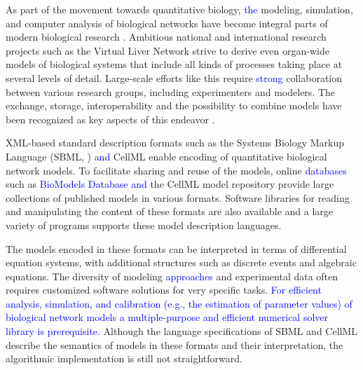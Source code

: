 \documentclass[10pt]{bmc_article}
\newenvironment{bmcformat}{\fussy\setboolean{publ}{true}}{\fussy}
\newcommand{\COR}[1]{\textcolor{blue}{#1}}
\begin{document}
\begin{bmcformat}
As part of the movement towards quantitative biology, \COR{the} modeling, 
simulation, and computer analysis of biological networks have become integral
parts of modern biological research \cite{Macilwain2011}.
Ambitious national and international research projects such as the Virtual Liver
Network \cite{Holzhuetter2012} strive to derive even organ-wide models of
biological systems that include all kinds of processes taking place at several
levels of detail.
Large-scale efforts like this require \COR{strong} collaboration between various
research groups, including experimenters and modelers. The exchange, storage,
interoperability and the possibility to combine models have been recognized as
key aspects of this endeavor \cite{Liebermeister2009sta}.

XML-based standard description formats \cite{Bray2000} such as the Systems
Biology Markup Language (\acs{SBML}, \cite{Hucka2004}) \COR{and} CellML \cite{Lloyd2004}
enable encoding of quantitative biological network models.
To facilitate sharing and reuse of the models, online \COR{databases} such as
\COR{BioModels Database} \cite{Novere2006a} \COR{and} the CellML model repository
\cite{Lloyd2008} provide large collections of published models in various
formats.
Software libraries for reading and manipulating the content
of these formats are also available \cite{Bornstein2008, Miller2010,
Draeger2011b} and a large variety of programs supports these model description
languages.

The models encoded in these formats can be interpreted in terms of differential
equation systems, with additional structures such as discrete events and
algebraic equations. 
The diversity of modeling \COR{approaches} and experimental data often requires
customized software solutions for very specific tasks.
\COR{For efficient analysis, simulation, and calibration (e.g.,
the estimation of parameter values) of biological network models a multiple-purpose and efficient numerical
solver library is prerequisite.}
Although the language specifications of \acs{SBML} \cite{Hucka2001, Hucka2003,
Finney2003a, Finney2006, Hucka2007, Hucka2008, Hucka2010a} 
and CellML \cite{Cuellar2006} describe the semantics of models in these formats
and their interpretation, the algorithmic implementation is still not
straightforward.


\end{bmcformat}
\end{document}
